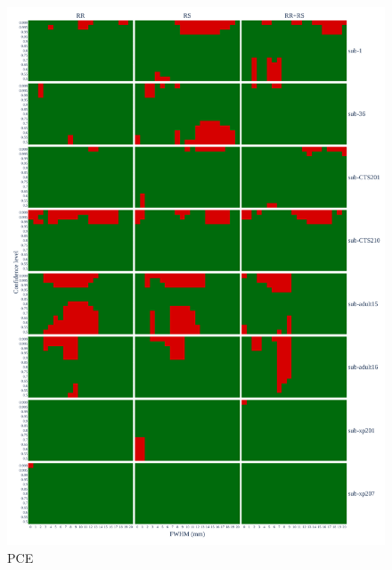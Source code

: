 \documentclass{article}
\begin{document}
\begin{figure}
    \centering
    \includegraphics[width=\linewidth]{figures/exclude_pce.pdf}
    \caption{PCE}
    \label{fig:loo_pce}
\end{figure}
\end{document}
